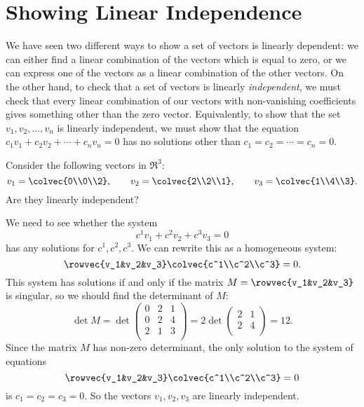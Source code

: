 \section{Showing Linear Independence} 
We have seen two different ways to show a set of vectors is linearly dependent: we can either find a linear combination of the vectors which is equal to zero, or we can express one of the vectors as a linear combination of the other vectors. On the other hand, to check that a set of vectors is linearly {\itshape independent}, we must check that every  linear combination of our vectors with non-vanishing coefficients gives something other than the zero vector. Equivalently, to show that the set \(v_1, v_2, \ldots, v_n\) is linearly independent, we must show that the equation \(c_1 v_1+c_2v_2 + \cdots + c_n v_n=0\) has no solutions other than \(c_1=c_2=\cdots=c_n=0.\)

\begin{example}
Consider the following vectors in $\Re^3$:
\[
v_1=\colvec{0\\0\\2},
\qquad v_2=\colvec{2\\2\\1},
\qquad v_3=\colvec{1\\4\\3}.
\]
Are they linearly independent?

We need to see whether the system
\[
c^1v_1 + c^2v_2+ c^3v_3=0
\]
has any solutions for $c^1, c^2, c^3$.  We can rewrite this as a homogeneous system:
\[
\rowvec{v_1&v_2&v_3}\colvec{c^1\\c^2\\c^3}=0.
\]
This system has solutions if and only if the matrix $M=\rowvec{v_1&v_2&v_3}$ is singular, so we should find the determinant of $M$:
\[
\det M = \det \begin{pmatrix}
0 & 2 & 1 \\
0 & 2 & 4 \\
2 & 1 & 3 \\
\end{pmatrix}
= 2 \det \begin{pmatrix}
2 & 1 \\
2 & 4 \\
\end{pmatrix}
=12.
\]
Since the matrix \(M\) has non-zero determinant, the only solution to the system of equations
\[
\rowvec{v_1&v_2&v_3}\colvec{c^1\\c^2\\c^3}=0
\]
is \(c_1=c_2=c_3=0\). So the vectors \(v_1, v_2, v_3\) are linearly independent.
\end{example}

